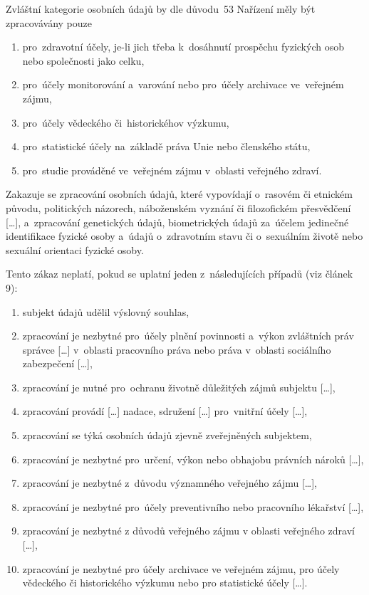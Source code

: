 Zvláštní kategorie osobních údajů by dle důvodu~53 Nařízení měly být zpracovávány pouze

\begin{enumerate}[label=\alph*)]
\item pro~zdravotní účely, je-li jich třeba k~dosáhnutí prospěchu fyzických osob nebo společnosti jako celku,
\item pro~účely monitorování a~varování nebo pro~účely archivace ve~veřejném zájmu,
\item pro~účely vědeckého či~historickéhov výzkumu,
\item pro~statistické účely na~základě práva Unie nebo členského státu,
\item pro~studie prováděné ve~veřejném zájmu v~oblasti veřejného zdraví.
\end{enumerate}

Zakazuje se zpracování osobních údajů, které vypovídají o~rasovém či etnickém původu, politických názorech, náboženském vyznání či filozofickém přesvědčení [\dots], a~zpracování genetických údajů, biometrických údajů za~účelem jedinečné identifikace fyzické osoby a~údajů o~zdravotním stavu či o~sexuálním životě nebo sexuální orientaci fyzické osoby.

Tento zákaz neplatí, pokud se uplatní jeden z~následujících případů (viz článek 9):

\begin{enumerate}[label=\alph*)]
\item subjekt údajů udělil výslovný souhlas,
\item zpracování je nezbytné pro~účely plnění povinnosti a~výkon zvláštních práv správce [\dots] v~oblasti pracovního práva nebo práva v~oblasti sociálního zabezpečení [\dots],
\item zpracování je nutné pro~ochranu životně důležitých zájmů subjektu [\dots],
\item zpracování provádí [\dots] nadace, sdružení [\dots] pro~vnitřní účely [\dots],
\item zpracování se týká osobních údajů zjevně zveřejněných subjektem,
\item zpracování je nezbytné pro~určení, výkon nebo obhajobu právních nároků [\dots],
\item zpracování je nezbytné z~důvodu významného veřejného zájmu [\dots],
\item zpracování je nezbytné pro~účely preventivního nebo pracovního lékařství [\dots],
\item zpracování je nezbytné z důvodů veřejného zájmu v oblasti veřejného zdraví [\dots],
\item zpracování je nezbytné pro účely archivace ve veřejném zájmu, pro účely vědeckého či historického výzkumu nebo pro statistické účely [\dots].
\end{enumerate}

